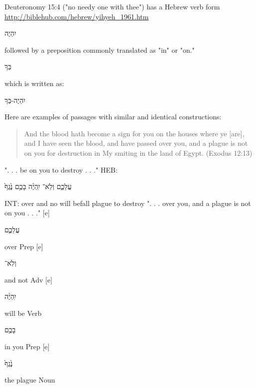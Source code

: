 \documentclass[11pt]{article}
\begin{document}
Deuteronomy 15:4 ("no needy one with thee") has a Hebrew verb form \url{http://biblehub.com/hebrew/yihyeh_1961.htm} \begin{hebrew}
יִהְיֶה
\end{hebrew} followed by a preposition commonly translated as "in" or "on."\begin{hebrew}
בְּךָ
\end{hebrew} which is written as: \begin{hebrew}
יִהְיֶה-בְּךָ
\end{hebrew}
Here are examples of passages with similar and identical constructions:
\begin{quote}
And the blood hath become a sign for you on the houses where ye [are], and I have seen the blood, and have passed over you, and a plague is not on you for destruction in My smiting in the land of Egypt.
(Exodus 12:13)
\end{quote}
". . . be on you to destroy . . ."\newline
HEB: \begin{hebrew} עֲלֵכֶ֑ם וְלֹֽא־ יִֽהְיֶ֨ה בָכֶ֥ם נֶ֙גֶף֙ \end{hebrew} \newline
INT: over and no will befall plague to destroy \newline
". . . over you, and a plague is not on you . . ."  [e]	%
\begin{hebrew}	עֲלֵכֶ֑ם	\end{hebrew}over	Prep  [e]	%
\begin{hebrew}	וְלֹֽא־\end{hebrew}	and not	Adv  [e]	%
\begin{hebrew}	יִֽהְיֶ֨ה	\end{hebrew}will be	Verb \newline
\phantom{1961 [e]	} \begin{hebrew}בָכֶ֥ם\end{hebrew}	in you	Prep  [e]	%
\begin{hebrew}נֶ֙גֶף֙\end{hebrew}	the plague	Noun \newline \newline
\end{document}
